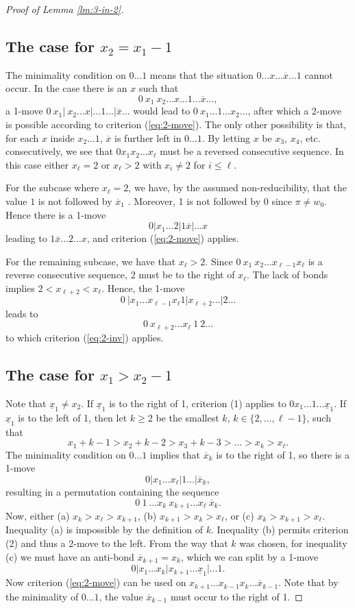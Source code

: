 \documentclass[11pt]{amsart} %
\newcommand{\xbar}{\overline{x}}
\begin{document}
\begin{proof}[Proof of Lemma \ref{lm:3-in-2}]
\subsection{The case for $x_2=x_1-1$} 
The minimality condition on $0\dots 1$ means that the situation
$0\dots x\dots \xbar\dots 1$ cannot occur. In the case 
there is an $x$  such that 
$$0\ x_1\ x_2 \dots x\dots 1\dots \xbar \dots,$$ 
a 1-move $0\ x_1 |\ x_2\dots x|\dots 1\dots |\xbar \dots$
would lead to $0\ x_1\dots 1\dots x_2 \dots$, after which a
2-move is possible according to criterion (\ref{eq:2-move}). 
The only other possibility is that, for each $x$ inside  $x_2 \ldots1$,
$\xbar$ is further left in $0 \ldots 1$.  By letting $x$ be $x_3$,  $x_4$,
etc. consecutively, we see  that 
$0 x_1 x_2 \ldots x_{\ell}$ must be a reversed consecutive sequence.
In this case 
either 
$x_{\ell} =2$ or $x_{\ell} >2$ with $x_i \ne 2$ for $i \le \ell$.

For the subcase where $x_{\ell}  = 2$, we have, by the assumed non-reducibility,
that the value $1$ is not followed by $\xbar_1$ .
 Moreover, 1 is not followed by 0  since $\pi\neq w_0$.
Hence there is a 1-move $$0|x_1\dots 2|1 \xbar|\dots x$$ leading to
$1\xbar\dots 2\dots x$, and criterion (\ref{eq:2-move}) applies.

For the  remaining subcase, we have that  $x_\ell>2$.  Since
$0\ x_1\ x_2 \dots x_{\ell-1} x_{\ell}$
is a reverse consecutive sequence, 2 must be to the right of 
$x_{\ell}$.  The lack of bonds  implies $2 < x_{\ell + 2} < x_{\ell}$. 
Hence, the 1-move 
$$ 0\ | x_1  \ldots    x_{\ell-1} x_{\ell}  1|   x_{\ell + 2}
\ldots | 2 \ldots $$
leads to 
$$  0 \   x_{\ell + 2} \ldots  x_{\ell} \ 1\  2 \ldots$$
to which  criterion (\ref{eq:2-inv}) applies.

\subsection{The case for $x_1  > x_2 -1$ }
Note that  $\underline{x}_1  \neq  x_2$.
If   $\underline{x}_1 $ is to the right of 1, criterion (1) 
applies to  $0 x_1 \dots 1 \dots
\underline{x}_1$.
 If $\underline{x}_1 $  is to the left of 1, then 
let $k \ge 2 $ be the smallest $k$,  $k \in \{ 2, \ldots, \ell -1 \}$,
such that 
$$
x_1 + k - 1 >
x_2 + k - 2 >
x_3 + k - 3 > \ldots  > 
x_k >
x_{\ell}.
$$
The minimality condition on $0 \ldots 1$ implies that $\xbar_k$
is to the right of 1, so there is a 1-move 
$$
0|x_1\dots
x_\ell|1\dots |\xbar_k,
$$ 
resulting in a permutation containing the sequence
 $$ 0 \ 1\ \dots x_k\ x_{k+1}\dots
x_\ell\ \xbar_k.$$
Now, either (a) $x_k > x_{\ell}  > x_{k+1}$,
            (b) $x_{k+1} > x_k > x_{\ell}$,   or
            (c) $ x_k >  x_{k+1} > x_{\ell}.$
Inequality (a) is impossible by the definition of $k$.
Inequality (b) permits criterion (2) and thus a 2-move to the left.
From the way that $k$ was chosen, for inequality (c) we
must have an anti-bond $\xbar_{k+1} = x_k$, which we 
can split by a 1-move 
$$0|x_1\dots x_k|x_{k+1}\dots\underline{x}_1|\dots 1.$$ 
Now criterion (\ref{eq:2-move}) can be
used on $x_{k+1}\dots x_{k-1}x_k \dots \xbar_{k-1}$. Note that by
the minimality of $0\dots 1$, the value $\xbar_{k-1}$ must occur
to the right of 1.


\end{proof}
\end{document}
